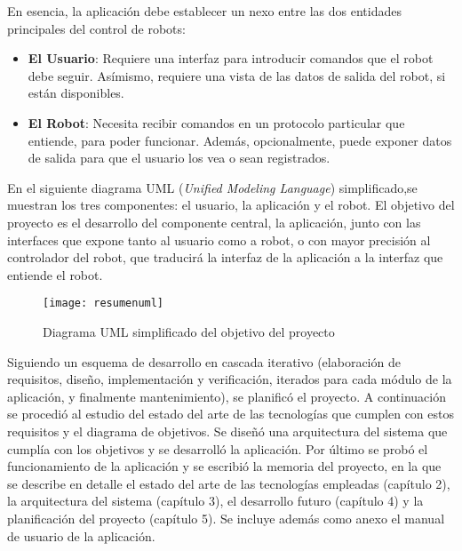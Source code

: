 En esencia, la aplicación debe establecer un nexo entre las dos entidades principales del control de robots:
\begin{itemize}
	\item \textbf{El Usuario}: Requiere una interfaz para introducir comandos que el robot debe seguir. Asímismo, requiere una 
	vista de las datos de salida del robot, si están disponibles.
	\item \textbf{El Robot}: Necesita recibir comandos en un protocolo particular que entiende, para poder funcionar. Además, 
	opcionalmente, puede exponer datos de salida para que el usuario los vea o sean registrados.
\end{itemize}
En el siguiente diagrama UML (\textit{Unified Modeling Language}) simplificado,se muestran los tres componentes: el usuario, la 
aplicación y el robot. El objetivo del proyecto es el desarrollo del componente central, la aplicación, junto con las interfaces 
que expone tanto al usuario como a robot, o con mayor precisión al controlador del robot, que traducirá la interfaz de la 
aplicación a la interfaz que entiende el robot.
\begin{figure}[H]
\centering
\captionsetup{justification=centering}
\texttt{[image: resumenuml]}
\caption{Diagrama UML simplificado del objetivo del proyecto}
\end{figure}

Siguiendo un esquema de desarrollo en cascada iterativo (elaboración de requisitos, diseño, implementación y verificación, 
iterados para cada módulo de la aplicación, y finalmente mantenimiento), se planificó el proyecto. A continuación se procedió al 
estudio del estado del arte de las tecnologías que cumplen con estos requisitos y el diagrama de objetivos. Se diseñó una 
arquitectura del sistema que cumplía con los objetivos y se desarrolló la aplicación. Por último se probó el funcionamiento de la 
aplicación y se escribió la memoria del proyecto, en la que se describe en detalle el estado del arte de las tecnologías 
empleadas (capítulo 2), la arquitectura del sistema (capítulo 3), el desarrollo futuro (capítulo 4) y la planificación del 
proyecto (capítulo 5). Se incluye además como anexo el manual de usuario de la aplicación.\\


